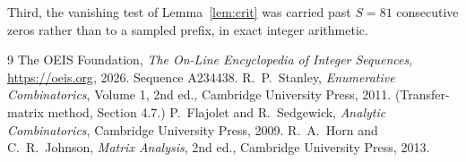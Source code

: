 \documentclass[11pt,a4paper]{article}
\theoremstyle{plain}
\theoremstyle{definition}
\begin{document}
Third, the vanishing test of Lemma~\ref{lem:crit} was carried past $S=81$ consecutive
zeros rather than to a sampled prefix, in exact integer arithmetic.

\begin{thebibliography}{9}
 The OEIS Foundation, \emph{The On-Line Encyclopedia of Integer
Sequences}, \url{https://oeis.org}, 2026. Sequence A234438.
 R.~P.~Stanley, \emph{Enumerative Combinatorics}, Volume 1, 2nd ed.,
Cambridge University Press, 2011. (Transfer-matrix method, Section 4.7.)
 P.~Flajolet and R.~Sedgewick, \emph{Analytic Combinatorics}, Cambridge
University Press, 2009.
 R.~A.~Horn and C.~R.~Johnson, \emph{Matrix Analysis}, 2nd ed., Cambridge
University Press, 2013.
\end{thebibliography}
\end{document}
